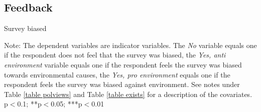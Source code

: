 \documentclass{article}
\begin{document}
\clearpage
\subsection{Feedback}



\begin{table}[h!]
	\caption{Survey biased}
	\begin{center}
		\scalebox{0.7}{}
	\end{center}
	{\footnotesize Note: The dependent variables are indicator variables. The \textit{No} variable equals one if the respondent does not feel that the survey was biased, the \textit{Yes, anti environment} variable equals one if the respondent feels the survey was biased towards environmental causes, the \textit{Yes, pro environment} equals one if the respondent feels the survey was biased against environment. See notes under Table \ref{table polviews} and Table \ref{table exists} for a description of the covariates.
	\newline *p$<$0.1; **p$<$0.05; ***p$<$0.01}
\end{table}	
\end{document}
